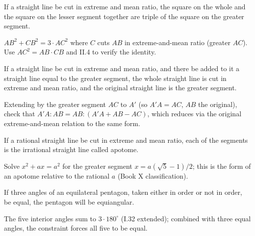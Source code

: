 \begin{claim}
\label{prop:XIII.4}
If a straight line be cut in extreme and mean ratio, the square on
the whole and the square on the lesser segment together are triple
of the square on the greater segment.
\end{claim}
\begin{evidence}
\label{ev:XIII.4}
$AB^2 + CB^2 = 3 \cdot AC^2$ where $C$ cuts $AB$ in extreme-and-mean
ratio (greater $AC$).  Use $AC^2 = AB \cdot CB$ and II.4 to verify
the identity.
\end{evidence}

\begin{claim}
\label{prop:XIII.5}
If a straight line be cut in extreme and mean ratio, and there be
added to it a straight line equal to the greater segment, the whole
straight line is cut in extreme and mean ratio, and the original
straight line is the greater segment.
\end{claim}
\begin{evidence}
\label{ev:XIII.5}
Extending by the greater segment $AC$ to $A'$ (so $A'A = AC$, $AB$
the original), check that $A'A : AB = AB : (A'A + AB - AC)$, which
reduces via the original extreme-and-mean relation to the same form.
\end{evidence}

\begin{claim}
\label{prop:XIII.6}
If a rational straight line be cut in extreme and mean ratio, each of
the segments is the irrational straight line called apotome.
\end{claim}
\begin{evidence}
\label{ev:XIII.6}
Solve $x^2 + ax = a^2$ for the greater segment $x = a(\sqrt{5} -
1)/2$; this is the form of an apotome relative to the rational $a$
(Book X classification).
\end{evidence}

\begin{claim}
\label{prop:XIII.7}
If three angles of an equilateral pentagon, taken either in order or
not in order, be equal, the pentagon will be equiangular.
\end{claim}
\begin{evidence}
\label{ev:XIII.7}
The five interior angles sum to $3 \cdot 180^\circ$ (I.32 extended);
combined with three equal angles, the constraint forces all five to
be equal.
\end{evidence}

